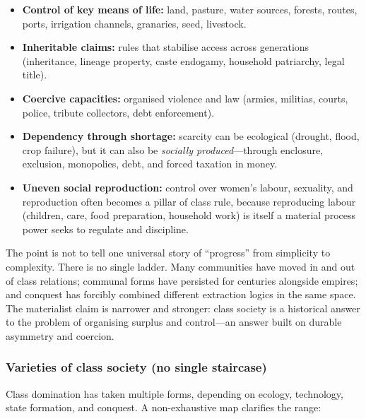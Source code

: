 \begin{itemize}[leftmargin=1.5em]
  \item \textbf{Control of key means of life:} land, pasture, water sources, forests, routes, ports, irrigation
        channels, granaries, seed, livestock.
  \item \textbf{Inheritable claims:} rules that stabilise access across generations (inheritance, lineage property,
        caste endogamy, household patriarchy, legal title).
  \item \textbf{Coercive capacities:} organised violence and law (armies, militias, courts, police, tribute collectors,
        debt enforcement).
  \item \textbf{Dependency through shortage:} scarcity can be ecological (drought, flood, crop failure), but it can also
        be \emph{socially produced}---through enclosure, exclusion, monopolies, debt, and forced taxation in money.\cite{Marx1867}
  \item \textbf{Uneven social reproduction:} control over women's labour, sexuality, and reproduction often becomes a pillar
        of class rule, because reproducing labour (children, care, food preparation, household work) is itself a material
        process power seeks to regulate and discipline.\cite{Scott2017}
\end{itemize}

The point is not to tell one universal story of ``progress'' from simplicity to complexity. There is no single ladder.
Many communities have moved in and out of class relations; communal forms have persisted for centuries alongside empires;
and conquest has forcibly combined different extraction logics in the same space. The materialist claim is narrower and
stronger: class society is a historical answer to the problem of organising surplus and control---an answer built on
durable asymmetry and coercion.

\subsubsection{Varieties of class society (no single staircase)}
\label{sec:varieties-class}

Class domination has taken multiple forms, depending on ecology, technology, state formation, and conquest. A non-exhaustive
map clarifies the range:

